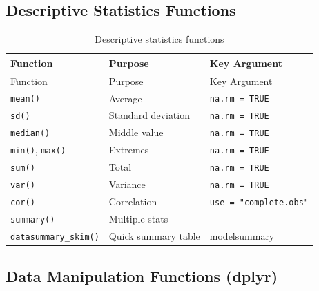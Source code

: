 \documentclass[
  letterpaper,
  DIV=11,
  numbers=noendperiod]{scrreprt}
\begin{document}
\subsection{Descriptive Statistics
Functions}\label{descriptive-statistics-functions-1}

\begin{longtable}[]{@{}lll@{}}
\caption{Descriptive statistics
functions}\label{tbl-desc-stats-ref}\tabularnewline
\toprule\noalign{}
Function & Purpose & Key Argument \\
\midrule\noalign{}
\endfirsthead
\toprule\noalign{}
Function & Purpose & Key Argument \\
\midrule\noalign{}
\endhead
\bottomrule\noalign{}
\endlastfoot
\texttt{mean()} & Average & \texttt{na.rm\ =\ TRUE} \\
\texttt{sd()} & Standard deviation & \texttt{na.rm\ =\ TRUE} \\
\texttt{median()} & Middle value & \texttt{na.rm\ =\ TRUE} \\
\texttt{min()}, \texttt{max()} & Extremes & \texttt{na.rm\ =\ TRUE} \\
\texttt{sum()} & Total & \texttt{na.rm\ =\ TRUE} \\
\texttt{var()} & Variance & \texttt{na.rm\ =\ TRUE} \\
\texttt{cor()} & Correlation & \texttt{use\ =\ "complete.obs"} \\
\texttt{summary()} & Multiple stats & --- \\
\texttt{datasummary\_skim()} & Quick summary table & modelsummary \\
\end{longtable}

\subsection{Data Manipulation Functions
(dplyr)}\label{data-manipulation-functions-dplyr-1}
\end{document}
